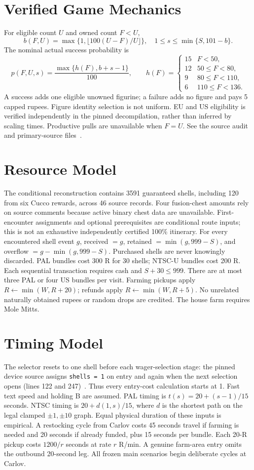 \documentclass[11pt]{article}
\theoremstyle{definition}\newtheorem{definition}[theorem]{Definition}
\begin{document}
\section{Verified Game Mechanics}
For eligible count $U$ and owned count $F<U$,
\[
 b(F,U)=\max\{1,\lfloor100(U-F)/U\rfloor\},\quad
 1\le s\le\min\{S,101-b\}.
\]
The nominal actual success probability is
\[
 p(F,U,s)=\frac{\max\{h(F),b+s-1\}}{100},\qquad
 h(F)=\begin{cases}15&F<50,\\12&50\le F<80,\\9&80\le F<110,\\6&110\le F<136.\end{cases}
\]
A success adds one eligible unowned figurine; a failure adds no figure and pays 5 capped rupees. Figure identity selection is not uniform. EU and US eligibility is verified independently in the pinned decompilation, rather than inferred by scaling times. Productive pulls are unavailable when $F=U$. See the source audit and primary-source files~\cite{device,eligibility,prices,caps}.
\section{Resource Model}
The conditional reconstruction contains 3591 guaranteed shells, including 120 from six Cucco rewards, across 46 source records. Four fusion-chest amounts rely on source comments because active binary chest data are unavailable. First-encounter assignments and optional prerequisites are conditional route inputs; this is not an exhaustive independently certified 100\% itinerary.
For every encountered shell event $g$, received $=g$, retained $=\min(g,999-S)$, and overflow $=g-\min(g,999-S)$. Purchased shells are never knowingly discarded.
PAL bundles cost 300 R for 30 shells; NTSC-U bundles cost 200 R. Each sequential transaction requires cash and $S+30\le999$. There are at most three PAL or four US bundles per visit. Farming pickups apply $R\leftarrow\min(W,R+20)$; refunds apply $R\leftarrow\min(W,R+5)$. No unrelated naturally obtained rupees or random drops are credited. The house farm requires Mole Mitts.
\section{Timing Model}
The selector resets to one shell before each wager-selection stage: the pinned device source assigns \texttt{shells = 1} on entry and again when the next selection opens (lines 122 and 247)~\cite{device}. Thus every entry-cost calculation starts at 1. Fast text speed and holding B are assumed. PAL timing is $t(s)=20+(s-1)/15$ seconds. NTSC timing is $20+d(1,s)/15$, where $d$ is the shortest path on the legal clamped $\pm1,\pm10$ graph. Equal physical duration of these inputs is empirical.
A restocking cycle from Carlov costs 45 seconds travel if farming is needed and 20 seconds if already funded, plus 15 seconds per bundle. Each 20-R pickup costs $1200/r$ seconds at rate $r$ R/min. A genuine farm-area entry omits the outbound 20-second leg. All frozen main scenarios begin deliberate cycles at Carlov.
\end{document}
